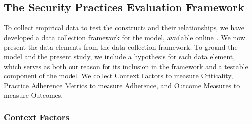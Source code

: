 \subsection{The Security Practices Evaluation Framework}

To collect empirical data to test the constructs and their relationships, we have developed a data collection framework for the model, available online~\cite{morrison2016spefsite}.   We now present the data elements from the data collection framework. To ground the model and the present study, we include a hypothesis for each data element, which serves as both our reason for its inclusion in the framework and a testable component of the model. We collect Context Factors to measure Criticality, Practice Adherence Metrics to measure Adherence, and Outcome Measures to measure Outcomes.
\subsubsection{Context Factors}
\label{sec:model_cf}

